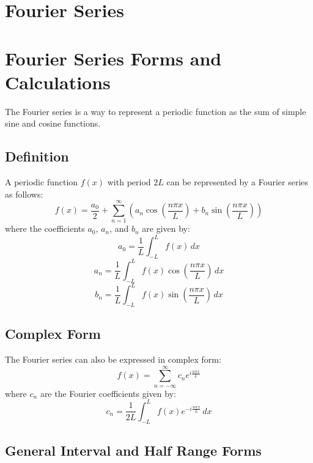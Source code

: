 \documentclass[a4paper,12pt]{article}
\begin{document}
\pagestyle{empty} 


\section{\huge\textbf{Fourier Series}}


\section*{Fourier Series Forms and Calculations}

The Fourier series is a way to represent a periodic function as the sum of simple sine and cosine functions.

\subsection*{Definition}

A periodic function \( f(x) \) with period \( 2L \) can be represented by a Fourier series as follows:
\[
f(x) = \frac{a_0}{2} + \sum_{n=1}^{\infty} \left( a_n \cos\left(\frac{n\pi x}{L}\right) + b_n \sin\left(\frac{n\pi x}{L}\right) \right)
\]
where the coefficients \( a_0 \), \( a_n \), and \( b_n \) are given by:
\[
a_0 = \frac{1}{L} \int_{-L}^{L} f(x) \, dx
\]
\[
a_n = \frac{1}{L} \int_{-L}^{L} f(x) \cos\left(\frac{n\pi x}{L}\right) \, dx
\]
\[
b_n = \frac{1}{L} \int_{-L}^{L} f(x) \sin\left(\frac{n\pi x}{L}\right) \, dx
\]

\subsection*{Complex Form}

The Fourier series can also be expressed in complex form:
\[
f(x) = \sum_{n=-\infty}^{\infty} c_n e^{i\frac{n\pi x}{L}}
\]
where \( c_n \) are the Fourier coefficients given by:
\[
c_n = \frac{1}{2L} \int_{-L}^{L} f(x) e^{-i\frac{n\pi x}{L}} \, dx
\]

\subsection*{General Interval and Half Range Forms}
\end{document}
